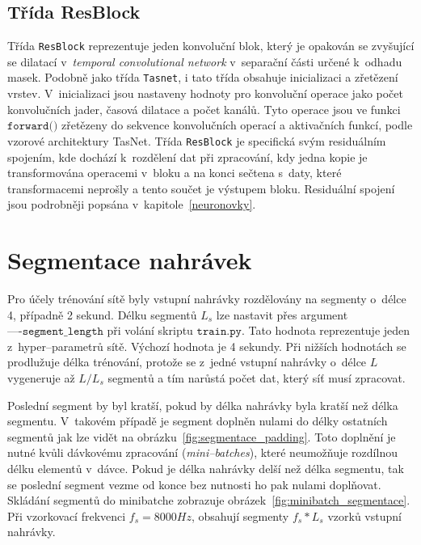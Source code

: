 \subsection*{Třída ResBlock}
Třída \texttt{ResBlock} reprezentuje jeden konvoluční blok, který je opakován se zvyšující se dilatací v~\textit{temporal convolutional network} v~separační části určené k~odhadu masek. Podobně jako třída \texttt{Tasnet}, i tato třída obsahuje inicializaci a zřetězení vrstev. V~inicializaci jsou nastaveny hodnoty pro konvoluční operace jako počet konvolučních jader, časová dilatace a počet kanálů. Tyto operace jsou ve funkci $\texttt{forward()}$ zřetězeny do sekvence konvolučních operací a aktivačních funkcí, podle vzorové architektury TasNet. Třída \texttt{ResBlock} je specifická svým residuálním spojením, kde dochází k~rozdělení dat při zpracování, kdy jedna kopie je transformována operacemi v~bloku a na konci sečtena s~daty, které transformacemi neprošly a tento součet je výstupem bloku. Residuální spojení jsou podrobněji popsána v~kapitole~\ref{neuronovky}.


\section{Segmentace nahrávek}
\label{sec:segmentace}
Pro účely trénování sítě byly vstupní nahrávky rozdělovány na segmenty o~délce 4, případně 2 sekund. Délku segmentů $L_s$ lze nastavit přes argument $\texttt{----segment\_length}$ při volání skriptu $\texttt{train.py}$. Tato hodnota reprezentuje jeden z~hyper--parametrů sítě. Výchozí hodnota je 4 sekundy. Při nižších hodnotách se prodlužuje délka trénování, protože se z~jedné vstupní nahrávky o~délce $L$ vygeneruje až $L/L_s$  segmentů a tím narůstá počet dat, který síť musí zpracovat. 

Poslední segment by byl kratší, pokud by délka nahrávky byla kratší než délka segmentu. V~takovém případě je segment doplněn nulami do délky ostatních segmentů jak lze vidět na obrázku~\ref{fig:segmentace_padding}. Toto doplnění je nutné kvůli dávkovému zpracování (\textit{mini--batches}), které neumožňuje rozdílnou délku elementů v~dávce. Pokud je délka nahrávky delší než délka segmentu, tak se poslední segment vezme od konce bez nutnosti ho pak nulami doplňovat. Skládání segmentů do minibatche zobrazuje obrázek~\ref{fig:minibatch_segmentace}. Při vzorkovací frekvenci $f_s = 8000Hz$, obsahují segmenty $f_s * L_s$ vzorků vstupní nahrávky. 


